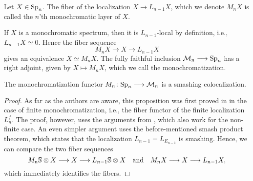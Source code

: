 \begin{definition}
    Let $X\in \sp\np$. The fiber of the localization $X\longrightarrow L_{n-1}X$, which we denote $M_n X$ is called the $n$'th { monochromatic layer} of $X$. 
\end{definition}

\begin{remark}
    If $X$ is a monochromatic spectrum, then it is $L_{n-1}$-local by definition, i.e., $L_{n-1}X\simeq 0$. Hence the fiber sequence 
    $$M_n X\longrightarrow X\longrightarrow L_{n-1}X$$
    gives an equivalence $X\simeq M_n X$. The fully faithful inclusion $\M\np\longrightarrow \sp\np$ has a right adjoint, given by $X\longmapsto M_nX$, which we call the { monochromatization}. 
\end{remark}

\begin{proposition}
    \label{ch0:prop:monochromatization-is-smashing}
    The monochromatization functor $M_n\colon \sp\np\longrightarrow \M\np$ is a smashing colocalization. 
\end{proposition}
\begin{proof}
    As far as the authors are aware, this proposition was first proved in \cite[Sec 6.3]{bousfield_1996} in the case of finite monochromatization, i.e., the fiber functor of the finite localization $L_n^f$. The proof, however, uses the arguments from \cite[2.10]{bousfield_1979_bool}, which also work for the non-finite case. An even simpler argument uses the before-mentioned smash product theorem, which states that the localization $L_{n-1} = L_{E_{n-1}}$ is smashing. Hence, we can compare the two fiber sequences
    $$M_n \S \otimes X \longrightarrow X \longrightarrow L_{n-1}\S\otimes X \quad \text{and}\quad M_n X\longrightarrow X\longrightarrow L_{n-1} X,$$
    which immediately identifies the fibers.  
\end{proof}



